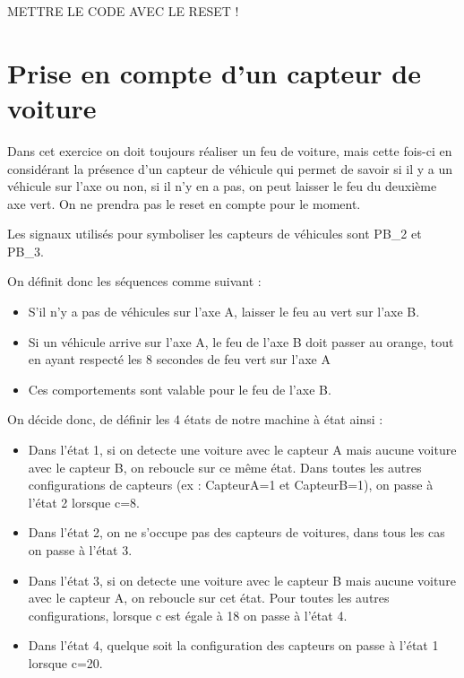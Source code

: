 \documentclass[11pt]{report}
\begin{document}
METTRE LE CODE AVEC LE RESET !

\section{Prise en compte d'un capteur de voiture}


Dans cet exercice on doit toujours réaliser un feu de voiture, mais cette fois-ci en considérant la présence d'un capteur de véhicule qui permet de savoir si il y a un véhicule sur l'axe ou non, si il n'y en a pas, on peut laisser le feu du deuxième axe vert. On ne prendra pas le reset en compte pour le moment.

Les signaux utilisés pour symboliser les capteurs de véhicules sont PB\_2 et PB\_3.

On définit donc les séquences comme suivant :
\begin{itemize}
	\item S'il n'y a pas de véhicules sur l'axe A, laisser le feu au vert sur l'axe B.
	\item Si un véhicule arrive sur l'axe A, le feu de l'axe B doit passer au orange, tout en ayant respecté les 8 secondes de feu vert sur l'axe A
	\item Ces comportements sont valable pour le feu de l'axe B. 

\end{itemize}

On décide donc, de définir les 4 états de notre machine à état ainsi :
\begin{itemize}
\item Dans l'état 1, si on detecte une voiture avec le capteur A mais aucune voiture avec le capteur B, on reboucle sur ce même état. Dans toutes les autres configurations de capteurs (ex : CapteurA=1 et CapteurB=1), on passe à l'état 2 lorsque c=8.
\item Dans l'état 2, on ne s'occupe pas des capteurs de voitures, dans tous les cas on passe à l'état 3.
\item Dans l'état 3, si on detecte une voiture avec le capteur B mais aucune voiture avec le capteur A, on reboucle sur cet état. Pour toutes les autres configurations, lorsque c est égale à 18 on passe à l'état 4.
\item Dans l'état 4, quelque soit la configuration des capteurs on passe à l'état 1 lorsque c=20.


\end{itemize}
\end{document}
